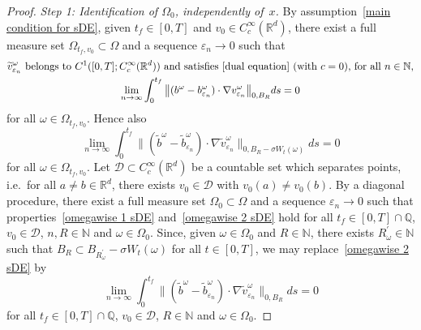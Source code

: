\documentclass[a4paper,10pt]{article}
\newcommand\1{\mathbbm{1}}
\newcommand{\eps}{\varepsilon}
\numberwithin{equation}{section}
\begin{document}
\begin{proof}
\emph{Step 1: Identification of $\Omega_0$, independently of~$x$.}
By assumption~\eqref{main condition for sDE}, given $t_{f}\in [0,T]  $ and $v_{0}\in C_{c}^{\infty}(\mathbb{R}^{d})$, there exist a full measure set $\Omega_{t_{f},v_{0}} \subset\Omega$ and a sequence $\eps_{n}\rightarrow0$ such that
\begin{gather}
\widetilde{v}_{\eps_{n}}^\omega \text{ belongs to } C^{1}([
0,T]  ;C_{c}^{\infty}(\mathbb{R}^{d}))  \text{ and satisfies~\eqref{dual equation} (with $c=0$), for all $n \in \mathbb{N}$,}
\label{omegawise 1 sDE} \\
\lim_{n\rightarrow\infty}\int_{0}^{t_{f}} \big\|(  b^\omega  -b_{\eps_{n}}^\omega)  \cdot\nabla
v_{\eps_{n}}^\omega \big\|_{0,B_R}ds=0  \nonumber
\end{gather}
for all $\omega\in\Omega_{t_{f},v_{0}}$. Hence also
\begin{equation}
\lim_{n\rightarrow\infty}\int_{0}^{t_{f}} \big\| ( \widetilde{b}^\omega  -\widetilde{b}_{\eps_{n}}^\omega )  \cdot\nabla\widetilde{v}_{\eps_{n}}^\omega \big\|_{0,B_{R}-\sigma W_{t} (\omega)} ds=0 \label{omegawise 2 sDE}
\end{equation}
for all $\omega\in\Omega_{t_{f},v_{0}}$. Let $\mathcal{D}\subset C_{c}^{\infty}(\mathbb{R}^{d})$ be a countable set which separates points, i.e.~for all $a\neq b\in\mathbb{R}^{d}$, there exists $v_{0}\in\mathcal{D}$ with $v_{0}(a) \neq v_{0}(b)$. By a diagonal procedure, there exist a full measure set $\Omega_{0}\subset\Omega$ and a sequence $\eps_{n}\rightarrow0$ such that properties~\eqref{omegawise 1 sDE} and~\eqref{omegawise 2 sDE} hold for all $t_{f}\in [0,T]  \cap\mathbb{Q}$, $v_{0}\in\mathcal{D}$, $n,R\in\mathbb{N}$ and $\omega\in \Omega_{0}$. Since, given $\omega\in \Omega_{0}$ and $R\in\mathbb{N}$, there exists $R_{\omega}^{\prime}\in\mathbb{N}$ such that $B_{R} \subset B_{R_{\omega }^{\prime}} -\sigma W_{t}(\omega)$ for all $t\in [0,T]  $, we may replace~\eqref{omegawise 2 sDE} by
\begin{equation}
\lim_{n\rightarrow\infty}\int_{0}^{t_{f}} \big\| (\widetilde{b}^\omega  -\widetilde{b}_{\eps_{n}}^\omega ) \cdot\nabla\widetilde{v}_{\eps_{n}}^\omega \big\|_{0,B_R}ds=0
\label{omegawise 2 bis sDE}
\end{equation}
for all $t_{f}\in [0,T]  \cap\mathbb{Q}$, $v_{0}\in\mathcal{D}$,
$R\in\mathbb{N}$ and $\omega\in \Omega_0$.


\end{proof}
\end{document}
